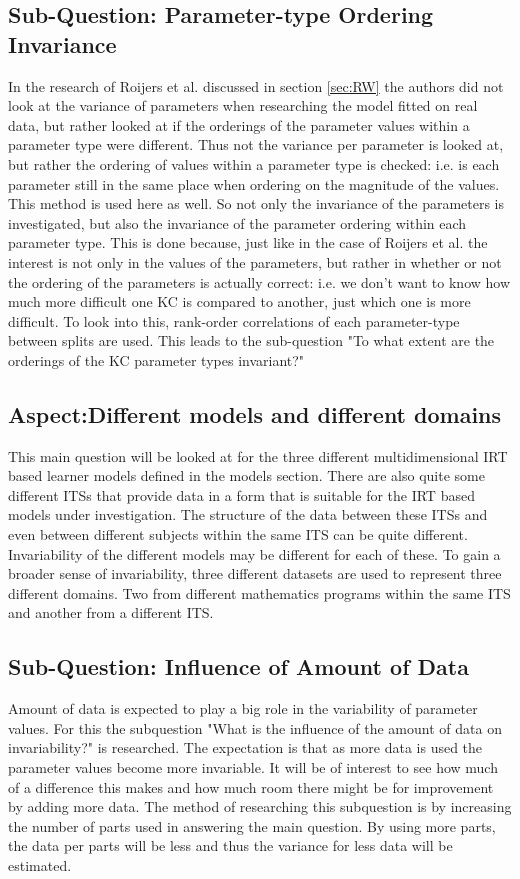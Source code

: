 \documentclass{scrartcl}
\begin{document}
\subsection{Sub-Question: Parameter-type Ordering Invariance}
In the research of Roijers et al. discussed in section \ref{sec:RW} the authors did not look at the variance of parameters when researching the model fitted on real data, but rather looked at if the orderings of the parameter values within a parameter type were different. Thus not the variance per parameter is looked at, but rather the ordering of values within a parameter type is checked: i.e. is each parameter still in the same place when ordering on the magnitude of the values. This method is used here as well. So not only the invariance of the parameters is investigated, but also the invariance of the parameter ordering within each parameter type. This is done because, just like in the case of Roijers et al. the interest is not only in the values of the parameters, but rather in whether or not the ordering of the parameters is actually correct: i.e. we don't want to know how much more difficult one KC is compared to another, just which one is more difficult. To look into this, rank-order correlations of each parameter-type between splits are used. This leads to the sub-question "To what extent are the orderings of the KC parameter types invariant?" 

\subsection{Aspect:Different models and different domains}
This main question will be looked at for the three different multidimensional IRT based learner models defined in the models section. There are also quite some different ITSs that provide data in a form that is suitable for the IRT based models under investigation. The structure of the data between these ITSs and even between different subjects within the same ITS can be quite different. Invariability of the different models may be different for each of these. To gain a broader sense of invariability, three different datasets are used to represent three different domains. Two from different mathematics programs within the same ITS and another from a different ITS.

\subsection{Sub-Question: Influence of Amount of Data}
Amount of data is expected to play a big role in the variability of parameter values. For this the subquestion "What is the influence of the amount of data on invariability?" is researched. The expectation is that as more data is used the parameter values become more invariable. It will be of interest to see how much of a difference this makes and how much room there might be for improvement by adding more data. The method of researching this subquestion is by increasing the number of parts used in answering the main question. By using more parts, the data per parts will be less and thus the variance for less data will be estimated.
\end{document}
